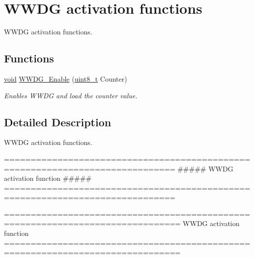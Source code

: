 \hypertarget{group___w_w_d_g___group2}{\section{W\-W\-D\-G activation functions}
\label{group___w_w_d_g___group2}
}


W\-W\-D\-G activation functions.  


\subsection*{Functions}
\begin{DoxyCompactItemize}
\item 
\hyperlink{group___n_a_m_e_ga18028b8badbf1ea7e704ccac3c488e82}{void} \hyperlink{group___w_w_d_g___group2_ga10dc2554d0b504b5472e3ecf0f02a9e6}{W\-W\-D\-G\-\_\-\-Enable} (\hyperlink{stdint_8h_aba7bc1797add20fe3efdf37ced1182c5}{uint8\-\_\-t} Counter)
\begin{DoxyCompactList}\small\item\em Enables W\-W\-D\-G and load the counter value. \end{DoxyCompactList}\end{DoxyCompactItemize}


\subsection{Detailed Description}
W\-W\-D\-G activation functions. \begin{DoxyVerb}  ==============================================================================
                    ##### WWDG activation function #####
  ==============================================================================  \end{DoxyVerb}


\begin{DoxyVerb} ===============================================================================
                       WWDG activation function
 ===============================================================================  \end{DoxyVerb}
 

